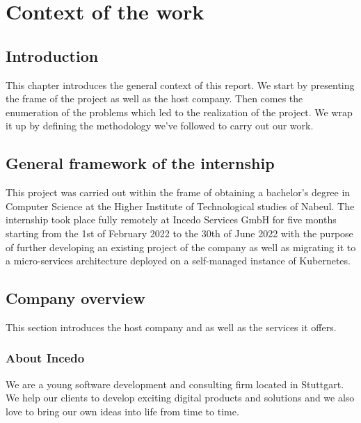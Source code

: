 \chapter{Context of the work}
\newpage

\setcounter{secnumdepth}{0} %
\section{Introduction}
This chapter introduces the general context of this report.
We start by presenting the frame of the project as well as the host company.
Then comes the enumeration of the problems which led to the realization of the project.
We wrap it up by defining the methodology we’ve followed to carry out our work.

\setcounter{secnumdepth}{2} %
\section{General framework of the internship}
This project was carried out within the frame of obtaining a bachelor’s degree in Computer Science at the Higher Institute of Technological studies of Nabeul.
The internship took place fully remotely at Incedo Services GmbH for five months starting from the 1st of February 2022 to the 30th of June 2022 with the purpose of further developing an existing project of the company as well as migrating it to a micro-services architecture deployed on a self-managed instance of Kubernetes.

\section{Company overview}
This section introduces the host company and as well as the services it offers.
\subsection{About Incedo}
We are a young software development and consulting firm located in Stuttgart.
We help our clients to develop exciting digital products and solutions and we also love to bring our own ideas into life from time to time.

